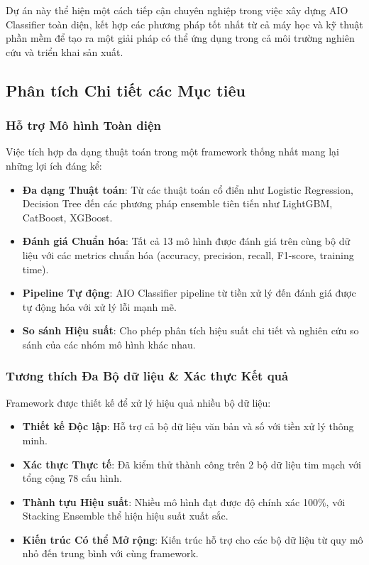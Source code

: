 \vspace{1em}
\noindent
Dự án này thể hiện một cách tiếp cận chuyên nghiệp trong việc xây dựng AIO Classifier toàn diện, kết hợp các phương pháp tốt nhất từ cả máy học và kỹ thuật phần mềm để tạo ra một giải pháp có thể ứng dụng trong cả môi trường nghiên cứu và triển khai sản xuất.

\subsection{Phân tích Chi tiết các Mục tiêu}\label{subsec:detailed-goals}

\subsubsection{Hỗ trợ Mô hình Toàn diện}

Việc tích hợp đa dạng thuật toán trong một framework thống nhất mang lại những lợi ích đáng kể:

\begin{itemize}
    \item \textbf{Đa dạng Thuật toán}: Từ các thuật toán cổ điển như Logistic Regression, Decision Tree đến các phương pháp ensemble tiên tiến như LightGBM, CatBoost, XGBoost.
    \item \textbf{Đánh giá Chuẩn hóa}: Tất cả 13 mô hình được đánh giá trên cùng bộ dữ liệu với các metrics chuẩn hóa (accuracy, precision, recall, F1-score, training time).
    \item \textbf{Pipeline Tự động}: AIO Classifier pipeline từ tiền xử lý đến đánh giá được tự động hóa với xử lý lỗi mạnh mẽ.
    \item \textbf{So sánh Hiệu suất}: Cho phép phân tích hiệu suất chi tiết và nghiên cứu so sánh của các nhóm mô hình khác nhau.
\end{itemize}

\subsubsection{Tương thích Đa Bộ dữ liệu \& Xác thực Kết quả}

Framework được thiết kế để xử lý hiệu quả nhiều bộ dữ liệu:

\begin{itemize}
    \item \textbf{Thiết kế Độc lập}: Hỗ trợ cả bộ dữ liệu văn bản và số với tiền xử lý thông minh.
    \item \textbf{Xác thực Thực tế}: Đã kiểm thử thành công trên 2 bộ dữ liệu tim mạch với tổng cộng 78 cấu hình.
    \item \textbf{Thành tựu Hiệu suất}: Nhiều mô hình đạt được độ chính xác 100\%, với Stacking Ensemble thể hiện hiệu suất xuất sắc.
    \item \textbf{Kiến trúc Có thể Mở rộng}: Kiến trúc hỗ trợ cho các bộ dữ liệu từ quy mô nhỏ đến trung bình với cùng framework.
\end{itemize}

